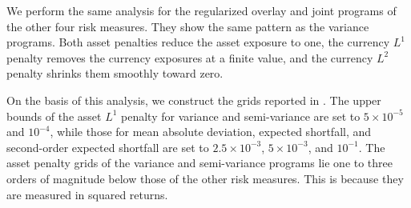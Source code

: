We perform the same analysis for the regularized overlay and joint programs of the other four risk measures. 
They show the same pattern as the variance
programs. Both asset penalties reduce the asset exposure to one, the currency $L^1$ penalty removes the currency
exposures at a finite value, and the currency $L^2$ penalty shrinks them smoothly toward zero. 

On the basis of this analysis, we construct the grids reported in . 
The upper bounds of the asset $L^1$ penalty for variance and
semi-variance are set to $5 \times 10^{-5}$
and $10^{-4}$, while those for mean absolute deviation, expected shortfall, and second-order expected shortfall are set to $2.5 \times 10^{-3}$, $5 \times 10^{-3}$, and $10^{-1}$.
The asset penalty grids
of the variance and semi-variance programs lie one to three orders of magnitude below those of the other risk measures. This 
is because they are measured in squared returns.

